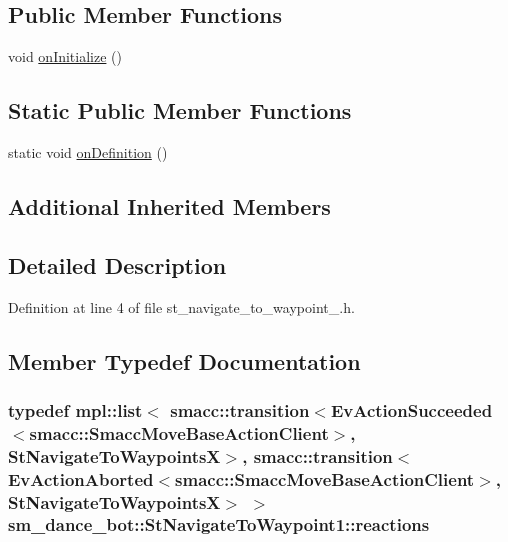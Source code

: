 \subsection*{Public Member Functions}
\begin{DoxyCompactItemize}
\item 
void \hyperlink{structsm__dance__bot_1_1StNavigateToWaypoint1_aa38b068a364e0a02adc39a32fd37cf77}{on\+Initialize} ()
\end{DoxyCompactItemize}
\subsection*{Static Public Member Functions}
\begin{DoxyCompactItemize}
\item 
static void \hyperlink{structsm__dance__bot_1_1StNavigateToWaypoint1_a03b6c5f4cfda110765f805762f3b09c8}{on\+Definition} ()
\end{DoxyCompactItemize}
\subsection*{Additional Inherited Members}


\subsection{Detailed Description}


Definition at line 4 of file st\+\_\+navigate\+\_\+to\+\_\+waypoint\+\_.\+h.



\subsection{Member Typedef Documentation}
\subsubsection[{\texorpdfstring{reactions}{reactions}}]{\setlength{\rightskip}{0pt plus 5cm}typedef mpl\+::list$<$ {\bf smacc\+::transition}$<$Ev\+Action\+Succeeded$<${\bf smacc\+::\+Smacc\+Move\+Base\+Action\+Client}$>$, {\bf St\+Navigate\+To\+WaypointsX}$>$, {\bf smacc\+::transition}$<$Ev\+Action\+Aborted$<${\bf smacc\+::\+Smacc\+Move\+Base\+Action\+Client}$>$, {\bf St\+Navigate\+To\+WaypointsX}$>$ $>$ {\bf sm\+\_\+dance\+\_\+bot\+::\+St\+Navigate\+To\+Waypoint1\+::reactions}}\hypertarget{structsm__dance__bot_1_1StNavigateToWaypoint1_a862635c188fcb82195c97223b2d6dd66}{}\label{structsm__dance__bot_1_1StNavigateToWaypoint1_a862635c188fcb82195c97223b2d6dd66}


